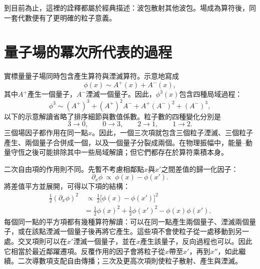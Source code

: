 到目前為止，這裡的詮釋都屬於經典描述：波包散射其他波包。場成為算符後，同一套代數便有了更明確的粒子意義。

\section{量子場的冪次所代表的過程}

實標量量子場同時包含產生算符與湮滅算符。示意地寫成
\begin{equation}
\phi(x)\sim A^+(x)+A^-(x),
\end{equation}
其中\(A^+\)產生一個量子，\(A^-\)湮滅一個量子。因此，\(\phi^3(x)\)包含四種局域過程：
\begin{equation}
\phi^3
\sim
(A^+)^3+(A^+)^2A^-+A^+(A^-)^2+(A^-)^3,
\end{equation}
以下的示意解讀省略了排序細節與數值係數。粒子數的四種變化分別是
\begin{equation}
3\longrightarrow0,
\qquad
0\longrightarrow3,
\qquad
2\longrightarrow1,
\qquad
1\longrightarrow2.
\end{equation}
三個場因子都作用在同一點\(x\)。因此，一個三次項就包含三個粒子湮滅、三個粒子產生、兩個量子合併成一個，以及一個量子分裂成兩個。在物理振幅中，能量--動量守恆之後可能排除其中一些局域解讀；但它們都存在於算符乘積本身。

二次自由項的作用則不同。先暫不考慮相鄰點\(x\)與\(x'\)之間差值的歸一化因子：
\begin{equation}
\partial_x\phi
\ \propto\
\phi(x)-\phi(x').
\end{equation}
將差值平方並展開，可得以下項的結構：
\begin{align}
\frac12(\partial_x\phi)^2
&\ \propto\
\frac12\bigl[\phi(x)-\phi(x')\bigr]^2
\\
&=
\frac12\phi(x)^2
+\frac12\phi(x')^2
-\phi(x)\phi(x').
\end{align}
每個同一點的平方項都有幾種算符解讀：可以在同一點產生兩個量子、湮滅兩個量子，或在該點湮滅一個量子後再將它產生。這些項不會使粒子從一處移動到另一處。交叉項則可以在\(x'\)湮滅一個量子，並在\(x\)產生該量子，反向過程也可以。因此它相當於最近鄰躍遷項。反覆作用的因子會將粒子從\(x\)帶至\(x'\)，再到\(x''\)，如此繼續。二次導數項支配自由傳播；三次及更高次項則使粒子散射、產生與湮滅。

\begin{classroomqa}
\end{classroomqa}

